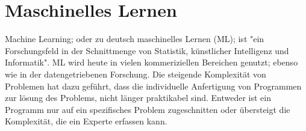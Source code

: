 \chapter{Maschinelles Lernen}
\label{ch:maschinelles lernen}

Machine Learning; oder zu deutsch maschinelles Lernen (ML); ist "ein Forschungsfeld in der Schnittmenge von Statistik, künstlicher Intelligenz und Informatik"\cite[S.~1]{Muller.2017}. ML wird heute in vielen kommeriziellen Bereichen genutzt; ebenso wie in der datengetriebenen Forschung. Die steigende Komplexität von Problemen hat dazu geführt, dass die individuelle Anfertigung von Programmen zur lösung des Problems, nicht länger praktikabel sind. Entweder ist ein Programm nur auf ein spezifisches Problem zugeschnitten oder übersteigt die Komplexität, die ein Experte erfassen kann. 

